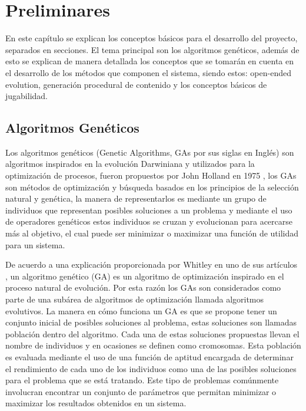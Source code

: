 \chapter{Preliminares}
\label{chapter:preliminaries}

En este capítulo se explican los conceptos básicos para
el desarrollo del proyecto, separados en secciones.
El tema principal son los algoritmos genéticos, 
además de esto se explican de manera detallada los conceptos que se
tomarán en cuenta en el desarrollo de los métodos que componen el sistema,
siendo estos: open-ended evolution, generación procedural de contenido y los
conceptos básicos de jugabilidad.

\section{Algoritmos Genéticos}
\label{section:genetic-algorithms}

Los algoritmos genéticos (Genetic Algorithms, GAs por sus siglas en Inglés) son
algoritmos inspirados en la evolución Darwiniana y utilizados para la
optimización de procesos, fueron propuestos por John Holland en 1975
\cite{Holland1975}, los GAs son métodos de optimización y búsqueda basados en los
principios de la selección natural y genética, la manera de representarlos es
mediante un grupo de individuos que representan posibles soluciones a un
problema y mediante el uso de operadores genéticos estos individuos se cruzan y
evolucionan para acercarse más al objetivo, el cual puede ser minimizar o
maximizar una función de utilidad para un sistema.

De acuerdo a una explicación proporcionada por Whitley en uno de sus artículos
\cite{Whitley1994}, un algoritmo genético (GA) es un algoritmo de optimización
inspirado en el proceso natural de evolución. Por esta razón los GAs son
considerados como parte de una subárea de algoritmos de optimización llamada
algoritmos evolutivos. La manera en cómo funciona un GA es que se propone tener
un conjunto inicial de posibles soluciones al problema, estas soluciones son
llamadas población dentro del algoritmo. Cada una de estas soluciones propuestas
llevan el nombre de individuos y en ocasiones se definen como cromosomas. Esta
población es evaluada mediante el uso de una función de aptitud encargada de
determinar el rendimiento de cada uno de los individuos como una de las posibles
soluciones para el problema que se está tratando. Este tipo de problemas
comúnmente involucran encontrar un conjunto de parámetros que permitan minimizar
o maximizar los resultados obtenidos en un sistema.

